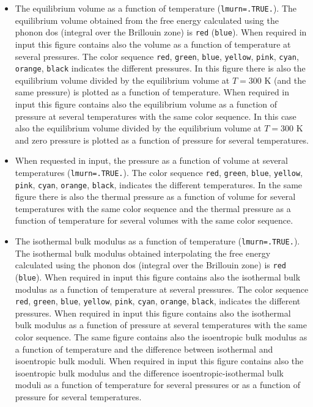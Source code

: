 \documentclass[12pt,a4paper,twoside]{report}
\begin{document}
\begin{itemize}
\item
The equilibrium volume as a function of temperature (\texttt{lmurn=.TRUE.}). 
The equilibrium volume obtained from the free energy calculated
using the phonon dos (integral over
the Brillouin zone) is \texttt{red} (\texttt{blue}).
When required in input this figure contains also the
volume as a function of temperature at several pressures.
The color sequence \texttt{red}, \texttt{green}, \texttt{blue},
\texttt{yellow}, \texttt{pink}, \texttt{cyan}, \texttt{orange},
\texttt{black} indicates the different pressures.
In this figure there is also the equilibrium volume divided by the 
equilibrium volume at $T= 300$ K (and the same pressure)
is plotted as a function of temperature.
When required in input this figure contains also the
equilibrium volume as a function of pressure at
several temperatures with the same color sequence.
In this case also the equilibrium volume divided by the 
equilibrium volume at $T= 300$ K and zero pressure
is plotted as a function of pressure for several temperatures.

\item
When requested in input, the pressure as a function of volume at 
several temperatures (\texttt{lmurn=.TRUE.}). 
The color sequence \texttt{red}, \texttt{green}, \texttt{blue},
\texttt{yellow}, \texttt{pink}, \texttt{cyan}, \texttt{orange},
\texttt{black}, indicates the different temperatures.
In the same figure there is also the thermal pressure as a function
of volume for several temperatures with the same color sequence
and the thermal pressure as a function
of temperature for several volumes with the same color sequence.

\item
The isothermal bulk modulus as a function of 
temperature (\texttt{lmurn=.TRUE.}). 
The isothermal bulk modulus obtained interpolating the free 
energy calculated using the phonon dos (integral over
the Brillouin zone) is \texttt{red} (\texttt{blue}).
When required in input this figure contains also the
isothermal bulk modulus as a function of temperature at 
several pressures.
The color sequence \texttt{red}, \texttt{green}, \texttt{blue},
\texttt{yellow}, \texttt{pink}, \texttt{cyan}, \texttt{orange},
\texttt{black}, indicates the different pressures.
When required in input this figure contains also the
isothermal bulk modulus as a function of pressure at
several temperatures with the same color sequence.
The same figure contains also the isoentropic bulk modulus
as a function of temperature and the difference between isothermal
and isoentropic bulk moduli. When required in input this figure 
contains also the isoentropic bulk modulus and the difference
isoentropic-isothermal bulk moduli as a function of temperature for
several pressures or as a function of pressure for several temperatures.


\end{itemize}
\end{document}
